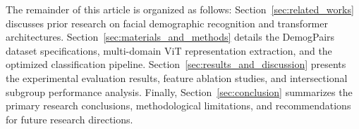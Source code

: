The remainder of this article is organized as follows: Section~\ref{sec:related_works} discusses prior research on facial demographic recognition and transformer architectures. Section~\ref{sec:materials_and_methods} details the DemogPairs dataset specifications, multi-domain ViT representation extraction, and the optimized classification pipeline. Section~\ref{sec:results_and_discussion} presents the experimental evaluation results, feature ablation studies, and intersectional subgroup performance analysis. Finally, Section~\ref{sec:conclusion} summarizes the primary research conclusions, methodological limitations, and recommendations for future research directions.
